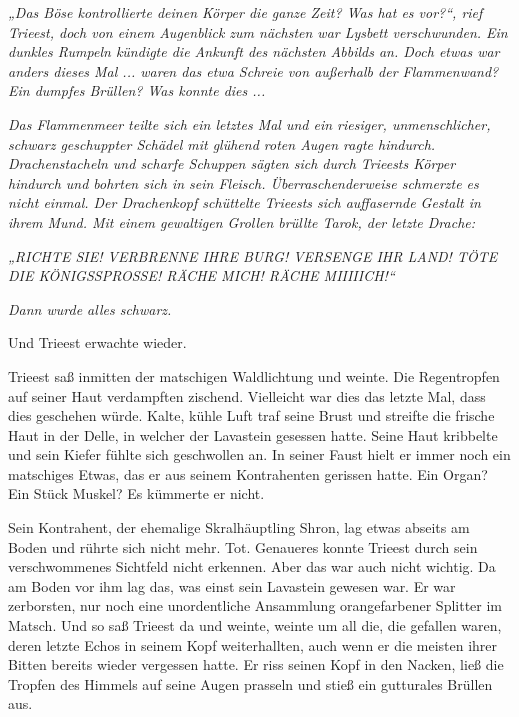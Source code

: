 \textit{„Das Böse kontrollierte deinen Körper die ganze Zeit? Was hat es vor?“, rief Trieest, doch von einem Augenblick zum nächsten war Lysbett verschwunden. Ein dunkles Rumpeln kündigte die Ankunft des nächsten Abbilds an. Doch etwas war anders dieses Mal ... waren das etwa Schreie von außerhalb der Flammenwand? Ein dumpfes Brüllen? Was konnte dies ...}

\textit{Das Flammenmeer teilte sich ein letztes Mal und ein riesiger, unmenschlicher, schwarz geschuppter Schädel mit glühend roten Augen ragte hindurch. Drachenstacheln und scharfe Schuppen sägten sich durch Trieests Körper hindurch und bohrten sich in sein Fleisch. Überraschenderweise schmerzte es nicht einmal. Der Drachenkopf schüttelte Trieests sich auffasernde Gestalt in ihrem Mund. Mit einem gewaltigen Grollen brüllte Tarok, der letzte Drache:}

\textit{„RICHTE SIE! VERBRENNE IHRE BURG! VERSENGE IHR LAND! TÖTE DIE KÖNIGSSPROSSE! RÄCHE MICH! RÄCHE MIIIIICH!“}

\textit{Dann wurde alles schwarz.}

Und Trieest erwachte wieder.



\trennzeichen



Trieest saß inmitten der matschigen Waldlichtung und weinte. Die Regentropfen auf seiner Haut verdampften zischend. Vielleicht war dies das letzte Mal, dass dies geschehen würde. Kalte, kühle Luft traf seine Brust und streifte die frische Haut in der Delle, in welcher der Lavastein gesessen hatte. Seine Haut kribbelte und sein Kiefer fühlte sich geschwollen an. In seiner Faust hielt er immer noch ein matschiges Etwas, das er aus seinem Kontrahenten gerissen hatte. Ein Organ? Ein Stück Muskel? Es kümmerte er nicht.

Sein Kontrahent, der ehemalige Skralhäuptling Shron, lag etwas abseits am Boden und rührte sich nicht mehr. Tot. Genaueres konnte Trieest durch sein verschwommenes Sichtfeld nicht erkennen. Aber das war auch nicht wichtig. Da am Boden vor ihm lag das, was einst sein Lavastein gewesen war. Er war zerborsten, nur noch eine unordentliche Ansammlung orangefarbener Splitter im Matsch. Und so saß Trieest da und weinte, weinte um all die, die gefallen waren, deren letzte Echos in seinem Kopf weiterhallten, auch wenn er die meisten ihrer Bitten bereits wieder vergessen hatte. Er riss seinen Kopf in den Nacken, ließ die Tropfen des Himmels auf seine Augen prasseln und stieß ein gutturales Brüllen aus.

